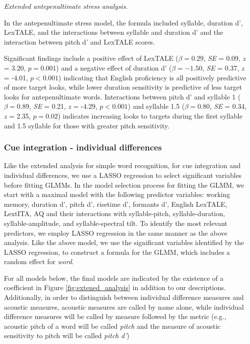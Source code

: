 \textit{Extended antepenultimate stress analysis}.

In the antepenultimate stress model, the formula included syllable, duration d', LexTALE, and the interactions between syllable and duration d' and the interaction between pitch d' and LexTALE scores. 

Significant findings include a positive effect of LexTALE ($\beta= 0.29$, \textit{SE} = 0.09, \textit{z} = 3.20, $p = 0.001$) and a negative effect of duration d' ($\beta= -1.50$, \textit{SE} = 0.37, \textit{z} = -4.01, $p < 0.001$) indicating that English proficiency is all positively predictive of more target looks, while lower duration sensitivity is predictive of less target looks for antepenultimate words. Interactions between pitch d' and syllable 1 ($\beta= 0.89$, \textit{SE} = 0.21, \textit{z} = -4.29, $p < 0.001$) and syllable 1.5 ($\beta= 0.80$, \textit{SE} = 0.34, \textit{z} = 2.35, $p = 0.02$) indicates increasing looks to targets during the first syllable and 1.5 syllable for those with greater pitch sensitivity.

\subsubsection{Cue integration - individual differences}

Like the extended analysis for simple word recognition, for cue integration and individual differences, we use a LASSO regression to select significant variables before fitting GLMMs. In the model selection process for fitting the GLMM, we start with a maximal model with the following predictor variables: working memory, duration d', pitch d', risetime d', formants d', English LexTALE, LextITA, AQ and their interactions with syllable-pitch, syllable-duration, syllable-amplitude, and syllable-spectral tilt. To identify the most relevant predictors, we employ LASSO regression in the same manner as the above analysis. Like the above model, we use the significant variables identified by the LASSO regression, to construct a formula for the GLMM, which includes a random effect for \textit{word}.

For all models below, the final models are indicated by the existence of a coefficient in Figure \ref{fig:extened_analysis} in addition to our descriptions. Additionally, in order to distinguish between individual difference measures and acoustic measures, acoustic measures are called by name alone, while individual difference measures will be called by measure followed by the metric (e.g., acoustic pitch of a word will be called \textit{pitch} and the measure of acoustic sensitivity to pitch will be called \textit{pitch d'}) 

